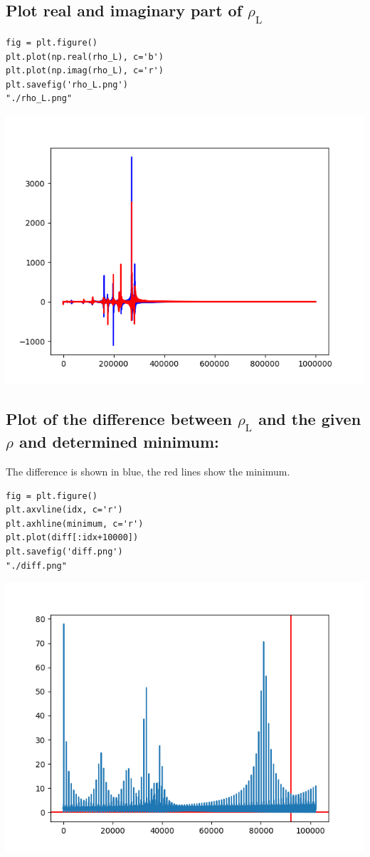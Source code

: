 \documentclass[11pt]{article}
\begin{document}
\subsection{Plot real and imaginary part of \(\rho_{\text{L}}\)}
\label{sec:orga5ea7f5}

\begin{verbatim}
fig = plt.figure()
plt.plot(np.real(rho_L), c='b')
plt.plot(np.imag(rho_L), c='r')
plt.savefig('rho_L.png')
"./rho_L.png"
\end{verbatim}

\begin{center}
\includegraphics[width=.9\linewidth]{./rho_L.png}
\end{center}

\subsection{Plot of the difference between \(\rho_{\text{L}}\) and the given \(\rho\) and determined minimum:}
\label{sec:org69d2c73}

The difference is shown in blue, the red lines show the minimum.

\begin{verbatim}
fig = plt.figure()
plt.axvline(idx, c='r')
plt.axhline(minimum, c='r')
plt.plot(diff[:idx+10000])
plt.savefig('diff.png')
"./diff.png"
\end{verbatim}

\begin{center}
\includegraphics[width=.9\linewidth]{./diff.png}
\end{center}
\end{document}
